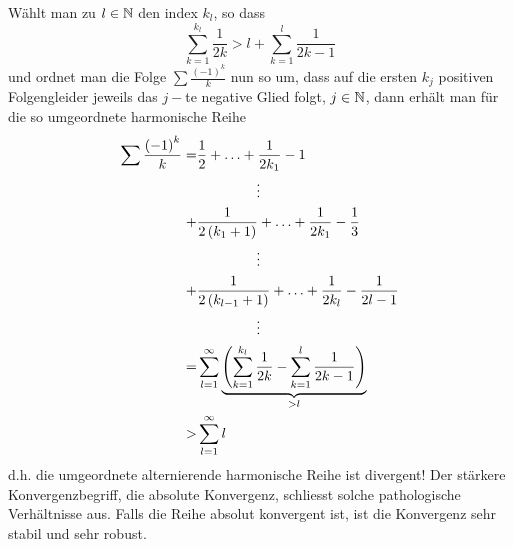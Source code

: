 \noindent Wählt man zu $l\in\mathbb{N}$ den index $k_l$, so dass
\[\sum\limits_{k = 1}^{{k_l}} {\frac{1}{{2k}}}  > l + \sum\limits_{k = 1}^l {\frac{1}{{2k - 1}}} \]
und ordnet man die Folge $\sum\frac{\left( -1\right)^k}{k}$ nun so um, dass auf die ersten $k_j$ positiven Folgengleider jeweils das $j-$te negative Glied folgt, $j\in\mathbb{N}$, dann erhält man für die so umgeordnete harmonische Reihe
\begin{align*}
\sum {\frac{{{{\left( { - 1} \right)}^k}}}{k}}  =& \frac{1}{2} +  \ldots  + \frac{1}{{2{k_1}}} - 1\\
 &\hspace{15mm}\vdots \\
 +& \frac{1}{{2\left( {{k_1} + 1} \right)}} +  \ldots  + \frac{1}{{2{k_1}}} - \frac{1}{3}\\
&\hspace{15mm} \vdots \\
 +& \frac{1}{{2\left( {{k_{l - 1}} + 1} \right)}} +  \ldots  + \frac{1}{{2{k_l}}} - \frac{1}{{2l - 1}}\\
 &\hspace{15mm}\vdots \\
 =& \sum\limits_{l = 1}^\infty  {\underbrace {\left( {\sum\limits_{k = 1}^{{k_l}} {\frac{1}{{2k}}}  - \sum\limits_{k = 1}^l {\frac{1}{{2k - 1}}} } \right)}_{ > l}} \\
 >& \sum\limits_{l = 1}^\infty  l
\end{align*}
d.h. die umgeordnete alternierende harmonische Reihe ist divergent! Der stärkere Konvergenzbegriff, die absolute Konvergenz, schliesst solche pathologische\\ Verhältnisse aus. Falls die Reihe absolut konvergent ist, ist die Konvergenz sehr stabil und sehr robust.
